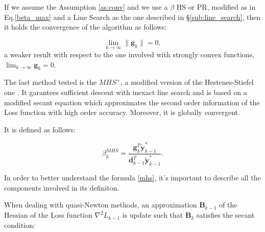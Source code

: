 			If we assume the Assumption \ref{as:conv} and we use a $\beta$ HS or PR, modified as in Eq.\ref{beta_max} and a Line Search as the one described in \S\ref{sub:line_search}, then it holds the convergence of the algorithm as follows\cite{Gilbert-1992}:

			\begin{equation}
			\label{conv_cg}
			  \lim_{k \to \infty} \|\textbf{g}_k\| = 0,
			\end{equation}
			a weaker result with respect to the one involved with strongly convex functions, $\lim_{k \to \infty} \textbf{g}_k = 0.$



			The last method tested is the $MHS^+$, a modified version of the Hestenes-Stiefel one \cite{LIVIERIS2013491}.
			It garantees sufficient descent with inexact line search and is based on a modified secant equation which approximates the second order information of the Loss function with high order accuracy. Moreover, it is globally convergent.

			It is defined as follows:

			\begin{equation}
			\label{mhs}
 				 \beta^{MHS}_k = \frac{\mathbf{g}_k^T \widetilde{\textbf{y}}_{k-1}^*}{\mathbf{d}_{k-1}^T\widetilde{\textbf{y}}_{k-1}^*}.
			\end{equation}

			In order to better understand the formula \ref{mhs}, it's important to describe all the components involved in its definiton.

			When dealing with quasi-Newton methods, an approximation $\textbf{B}_{k-1}$ of the Hessian of the Loss function $\nabla^2\textit{L}_{k-1}$ is update such that $\textbf{B}_k$ satisfies the secant condition:

